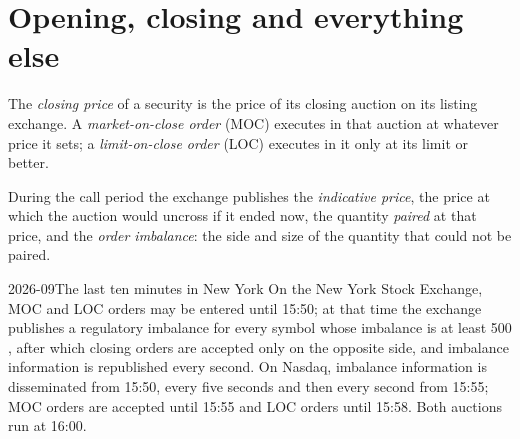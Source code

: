 \section{Opening, closing and everything else}

\begin{definition}\label{def:m1:auctions:moc}
The \emph{closing price} of a security is the price of
its closing auction on its listing exchange. A
\emph{market-on-close order} (MOC) executes in
that auction at whatever price it sets; a
\emph{limit-on-close order} (LOC) executes in it
only at its limit or better.
\end{definition}

\begin{definition}\label{def:m1:auctions:imbalance}
During the call period the exchange publishes the
\emph{indicative price}, the price at which the
auction would uncross if it ended now, the quantity \emph{paired} at that
price, and the \emph{order imbalance}: the side and
size of the quantity that could not be paired.
\end{definition}

\begin{dated}{2026-09}{The last ten minutes in New York}\label{dat:m1:auctions:us}
On the New York Stock Exchange, MOC and LOC orders may be entered until
15:50; at that time the exchange publishes a regulatory imbalance for every
symbol whose imbalance is at least 500 , after which closing orders
are accepted only on the opposite side, and imbalance information is
republished every second. On Nasdaq, imbalance information is disseminated
from 15:50, every five seconds and then every second from 15:55; MOC orders
are accepted until 15:55 and LOC orders until 15:58. Both auctions run at
16:00.
\end{dated}

